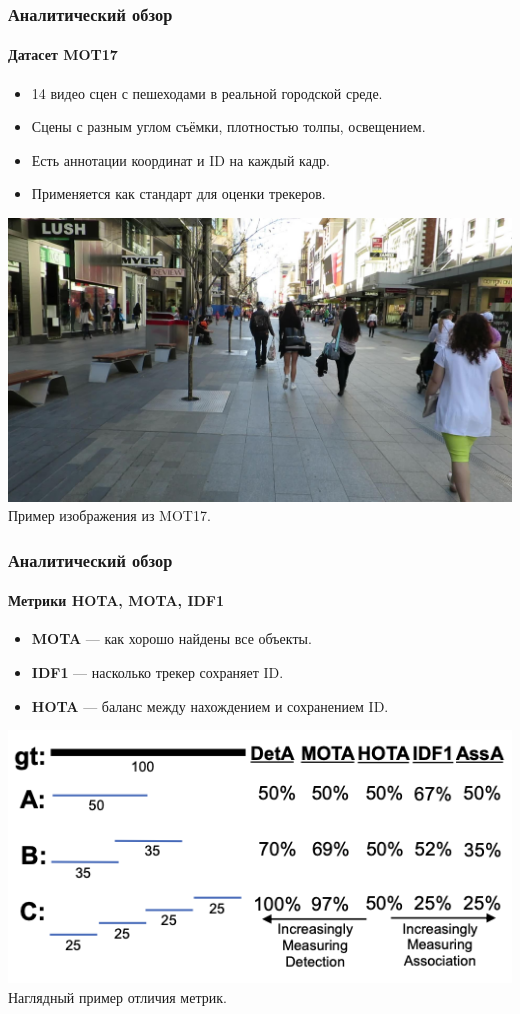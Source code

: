 \documentclass{beamer} %
\begin{document}
\begin{frame}
  \frametitle{Аналитический обзор}
  \framesubtitle{Датасет MOT17}
  \begin{itemize}
    \item 14 видео сцен с пешеходами в реальной городской среде.
    \item Сцены с разным углом съёмки, плотностью толпы, освещением.
    \item Есть аннотации координат и ID на каждый кадр.
    \item Применяется как стандарт для оценки трекеров.
  \end{itemize}
  \centering
  \includegraphics[width=0.7\linewidth]{images/review/MOT17_1.jpg}\\
  \small Пример изображения из MOT17.
\end{frame}

\begin{frame}
  \frametitle{Аналитический обзор}
  \framesubtitle{Метрики HOTA, MOTA, IDF1}
  \begin{itemize}
    \item \textbf{MOTA} — как хорошо найдены все объекты.
    \item \textbf{IDF1} — насколько трекер сохраняет ID.
    \item \textbf{HOTA} — баланс между нахождением и сохранением ID.
  \end{itemize}
  \centering
  \includegraphics[width=0.7\linewidth]{images/presentation/metrics.png}\\
  \small Наглядный пример отличия метрик.
\end{frame}
\end{document}
